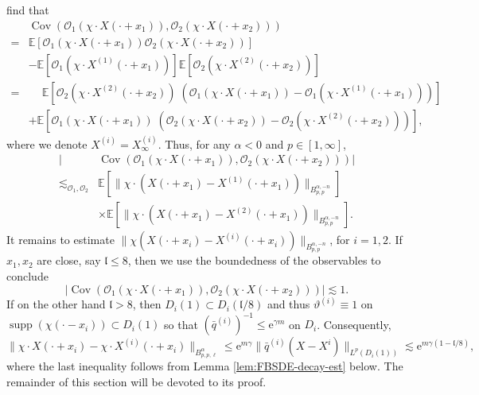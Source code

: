 \documentclass[11pt, a4paper]{scrartcl}
\numberwithin{equation}{section}
\theoremstyle{plain}
\theoremstyle{remark}
\newcommand{\mathe}{\mathrm{e}}
\newcommand{\tmop}[1]{\ensuremath{\operatorname{#1}}}
\begin{document}
find that
\[ \begin{aligned}
		  & \tmop{Cov} (\mathcal{O}_1 (\chi \cdot X (\cdot + x_1)), \mathcal{O}_2
		(\chi \cdot X (\cdot + x_2)))                                                 \\
		= & \mathbb{E} [\mathcal{O}_1 (\chi \cdot X (\cdot + x_1))  \mathcal{O}_2
		(\chi \cdot X (\cdot + x_2))]                                                 \\
		  & -\mathbb{E} [\mathcal{O}_1 (\chi \cdot X^{(1)}
			(\cdot + x_1))] \mathbb{E} [\mathcal{O}_2 (\chi \cdot X^{(2)} (\cdot +
		x_2))]                                                                        \\
		= & \phantom{+}\mathbb{E} [\mathcal{O}_2 (\chi \cdot X^{(2)}
			(\cdot + x_2))\;(\mathcal{O}_1 (\chi \cdot X (\cdot + x_1)) -
		\mathcal{O}_1 (\chi \cdot X^{(1)} (\cdot + x_1)))]                            \\
		  & +\mathbb{E} [\mathcal{O}_1 (\chi \cdot X (\cdot + x_1)) \; (\mathcal{O}_2
			(\chi \cdot X (\cdot + x_2)) - \mathcal{O}_2 (\chi \cdot X^{(2)} (\cdot +
			x_2)))],
	\end{aligned} \]
where we denote $X^{(i)} = X^{(i)}_{\infty}$. Thus, for any $\alpha < 0$ and
$p \in [1, \infty]$,
\[ \begin{aligned}
		|                                       & \tmop{Cov}(\mathcal{O}_1 (\chi \cdot X (\cdot + x_1)), \mathcal{O}_2
		(\chi \cdot X (\cdot + x_2))) |                                                                                \\
		\lesssim_{\mathcal{O}_1, \mathcal{O}_2} &
		\mathbb{E} \left[\| \chi \cdot (X (\cdot + x_1) - X^{(1)} (\cdot + x_1))
		\|_{B^{\alpha, - n}_{p, p}}\right]                                                                             \\
		                                        & \times
		\mathbb{E} \left[\| \chi \cdot (X (\cdot + x_1) - X^{(2)} (\cdot + x_1))
			\|_{B^{\alpha, - n}_{p, p}}\right].
	\end{aligned}\]
It remains to estimate $\| \chi (X (\cdot + x_i) - X^{(i)} (\cdot + x_i))
	\|_{B_{p, p}^{\alpha, - n}}$, for $i=1,2$. If $x_1, x_2$ are close, say $\mathfrak{l}
	\leqslant 8$, then we use the boundedness of the observables to conclude
\[ | \tmop{Cov} (\mathcal{O}_1 (\chi \cdot X (\cdot + x_1)), \mathcal{O}_2
	(\chi \cdot X (\cdot + x_2))) | \lesssim 1. \]
If on the other hand $\mathfrak{l}> 8$, then $D_i (1) \subset D_i
	(\mathfrak{l}/ 8)$ and thus $\vartheta^{(i)} \equiv 1$ on $\tmop{supp} (\chi (\cdot
	- x_i)) \subset D_i (1)$ so that $(\bar{q}^{(i)})^{- 1} \leqslant \mathe^{\gamma m}$
on $D_i$. Consequently,
\[ \| \chi \cdot X (\cdot + x_i) - \chi \cdot X^{(i)} (\cdot + x_i) \|_{B_{p,
					p, \ell}^{\alpha}} \leqslant \mathe^{m \gamma}  \| \bar{q}^{(i)} (X - X^i)
	\|_{L^p (D_i (1))} \lesssim \mathe^{m \gamma (1 -\mathfrak{l}/ 8)}, \]
where the last inequality follows from Lemma \ref{lem:FBSDE-decay-est} below.
The remainder of this section will be devoted to its proof.
\end{document}
